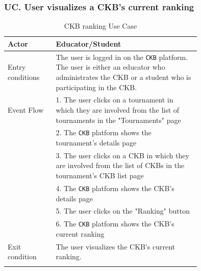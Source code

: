 
\subsubsection*{UC\cuc . User visualizes a CKB's current ranking}
\begin{center}
    \begin{longtable}{lp{0.75\linewidth}}
        \hline
        Actor            & Educator/Student \\
        \hline
        Entry conditions & The user is logged in on the \verb|CKB| platform. The user is either an educator who administrates the CKB or a student who is participating in the CKB. \\
        \hline
        Event Flow      
        & 1. The user clicks on a tournament in which they are involved from the list of tournaments in the "Tournaments" page\\
        & 2. The \verb|CKB| platform shows the tournament's details page\\
        & 3. The user clicks on a CKB in which they are involved from the list of CKBs in the tournament's CKB list page\\
        & 4. The \verb|CKB| platform shows the CKB's details page\\
        & 5. The user clicks on the "Ranking" button\\
        & 6. The \verb|CKB| platform shows the CKB's current ranking\\
        \hline
        Exit condition   & The user visualizes the CKB's current ranking.   \\
        \hline
        \caption{CKB ranking Use Case}
        \label{tab: ckb_ranking_use_case}
    \end{longtable}


\end{center}
